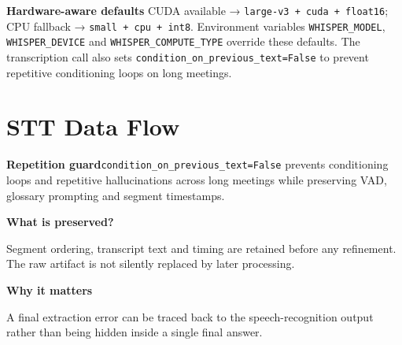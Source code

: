 \documentclass[9pt,a4paper]{extarticle}
\newcommand{\twocard}[4]{%
\begin{minipage}[t]{0.48\textwidth}\begin{card}\textbf{#1}\par #2\end{card}\end{minipage}\hfill%
\begin{minipage}[t]{0.48\textwidth}\begin{card}\textbf{#3}\par #4\end{card}\end{minipage}}
\begin{document}
\vspace{4pt}
\begin{card}
\textbf{Hardware-aware defaults}
\quad CUDA available → \texttt{large-v3 + cuda + float16}; CPU fallback → \texttt{small + cpu + int8}. Environment variables \texttt{WHISPER\_MODEL}, \texttt{WHISPER\_DEVICE} and \texttt{WHISPER\_COMPUTE\_TYPE} override these defaults. The transcription call also sets \texttt{condition\_on\_previous\_text=False} to prevent repetitive conditioning loops on long meetings.
\end{card}

\vspace{4pt}
\section*{STT Data Flow}
\vspace{2pt}
\begin{center}
\end{center}

\begin{notecard}\textbf{Repetition guard}\quad \texttt{condition\_on\_previous\_text=False} prevents conditioning loops and repetitive hallucinations across long meetings while preserving VAD, glossary prompting and segment timestamps.\end{notecard}

\vspace{4pt}
\twocard{What is preserved?}{Segment ordering, transcript text and timing are retained before any refinement. The raw artifact is not silently replaced by later processing.}{Why it matters}{\small A final extraction error can be traced back to the speech-recognition output rather than being hidden inside a single final answer.}
\end{document}
